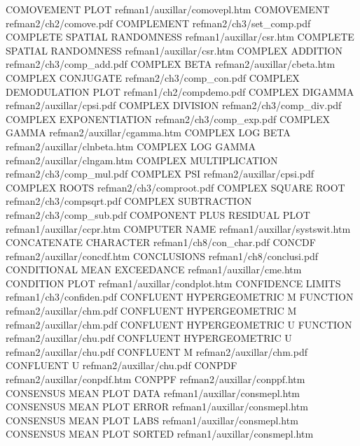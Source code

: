 COMOVEMENT PLOT                         refman1/auxillar/comovepl.htm
COMOVEMENT                              refman2/ch2/comove.pdf
COMPLEMENT                              refman2/ch3/set_comp.pdf
COMPLETE SPATIAL RANDOMNESS             refman1/auxillar/csr.htm
COMPLETE SPATIAL RANDOMNESS             refman1/auxillar/csr.htm
COMPLEX ADDITION                        refman2/ch3/comp_add.pdf
COMPLEX BETA                            refman2/auxillar/cbeta.htm
COMPLEX CONJUGATE                       refman2/ch3/comp_con.pdf
COMPLEX DEMODULATION PLOT               refman1/ch2/compdemo.pdf
COMPLEX DIGAMMA                         refman2/auxillar/cpsi.pdf
COMPLEX DIVISION                        refman2/ch3/comp_div.pdf
COMPLEX EXPONENTIATION                  refman2/ch3/comp_exp.pdf
COMPLEX GAMMA                           refman2/auxillar/cgamma.htm
COMPLEX LOG BETA                        refman2/auxillar/clnbeta.htm
COMPLEX LOG GAMMA                       refman2/auxillar/clngam.htm
COMPLEX MULTIPLICATION                  refman2/ch3/comp_mul.pdf
COMPLEX PSI                             refman2/auxillar/cpsi.pdf
COMPLEX ROOTS                           refman2/ch3/comproot.pdf
COMPLEX SQUARE ROOT                     refman2/ch3/compsqrt.pdf
COMPLEX SUBTRACTION                     refman2/ch3/comp_sub.pdf
COMPONENT PLUS RESIDUAL PLOT            refman1/auxillar/ccpr.htm
COMPUTER NAME                           refman1/auxillar/systswit.htm
CONCATENATE CHARACTER                   refman1/ch8/con_char.pdf
CONCDF                                  refman2/auxillar/concdf.htm
CONCLUSIONS                             refman1/ch8/conclusi.pdf
CONDITIONAL MEAN EXCEEDANCE             refman1/auxillar/cme.htm
CONDITION PLOT                          refman1/auxillar/condplot.htm
CONFIDENCE LIMITS                       refman1/ch3/confiden.pdf
CONFLUENT HYPERGEOMETRIC M FUNCTION     refman2/auxillar/chm.pdf
CONFLUENT HYPERGEOMETRIC M              refman2/auxillar/chm.pdf
CONFLUENT HYPERGEOMETRIC U FUNCTION     refman2/auxillar/chu.pdf
CONFLUENT HYPERGEOMETRIC U              refman2/auxillar/chu.pdf
CONFLUENT M                             refman2/auxillar/chm.pdf
CONFLUENT U                             refman2/auxillar/chu.pdf
CONPDF                                  refman2/auxillar/conpdf.htm
CONPPF                                  refman2/auxillar/conppf.htm
CONSENSUS MEAN PLOT DATA                refman1/auxillar/consmepl.htm
CONSENSUS MEAN PLOT ERROR               refman1/auxillar/consmepl.htm
CONSENSUS MEAN PLOT LABS                refman1/auxillar/consmepl.htm
CONSENSUS MEAN PLOT SORTED              refman1/auxillar/consmepl.htm

